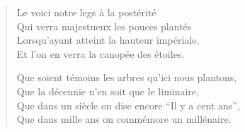 
\begin{verse}\quatrain
  Le voici notre legs à la postérité\\  %
  Qui verra majestueux les pouces plantés\\  %
  Lorsqu’ayant atteint la hauteur impériale.\\  %
  Et l’on en verra la canopée des étoiles. 

  Que soient  témoins les arbres qu’ici nous plantons,\\  %
  Que la décennie n’en soit que le liminaire,\\  %
  Que dans un siècle on dise encore \enquote{Il y a cent ans},\\  %
  Que dans mille ans on commémore un millénaire.
\end{verse}

